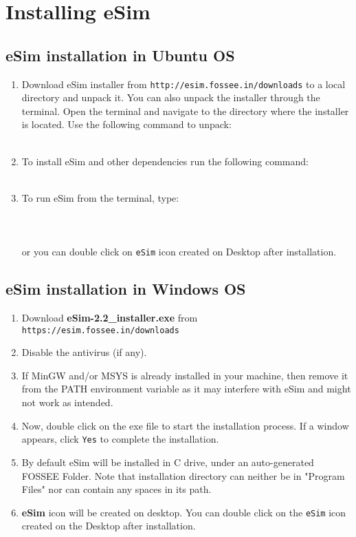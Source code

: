 \chapter{Installing eSim}
\thispagestyle{empty}
\label{chap3}

\section {eSim installation in Ubuntu OS}
\begin{enumerate}
\item Download eSim installer from {\tt http://esim.fossee.in/downloads} to a local directory and unpack it. You can also unpack the  installer through the terminal. Open the terminal and navigate to the directory where the installer is located. Use the following command to unpack: \\
\\
\item To install eSim and other dependencies run the following command: \\
\\
\item To run eSim from the terminal, type: \\ 
\\
 \\
\\
  or you can double click on {\tt eSim} icon created on Desktop after installation.
\end{enumerate}


\section {eSim installation in Windows OS}
\begin{enumerate}
\item Download \textbf{eSim-2.2\_installer.exe} from  {\tt https://esim.fossee.in/downloads}
\item Disable the antivirus (if any). 
\item If MinGW and/or MSYS is already installed in your machine, then remove it from the PATH environment variable as it may interfere with eSim and might not work as intended.
\item Now, double click on the exe file to start the installation process. If a window appears, click {\tt Yes} to complete the installation.
\item By default eSim will be installed in C drive, under an auto-generated FOSSEE Folder. Note that installation directory can neither be in "Program Files" nor can contain any spaces in its path.
\item \textbf{eSim} icon will be created on desktop. You can double click on the {\tt eSim} icon created on the Desktop after installation.
\end{enumerate}

